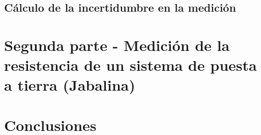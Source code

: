 \documentclass[12pt, letterpaper]{article}
\begin{document}
\subsection{Cálculo de la incertidumbre en la medición}

\section{Segunda parte - Medición de la resistencia de un sistema de puesta a tierra (Jabalina)}

\section{Conclusiones}


\label{LastPage}
\end{document}
